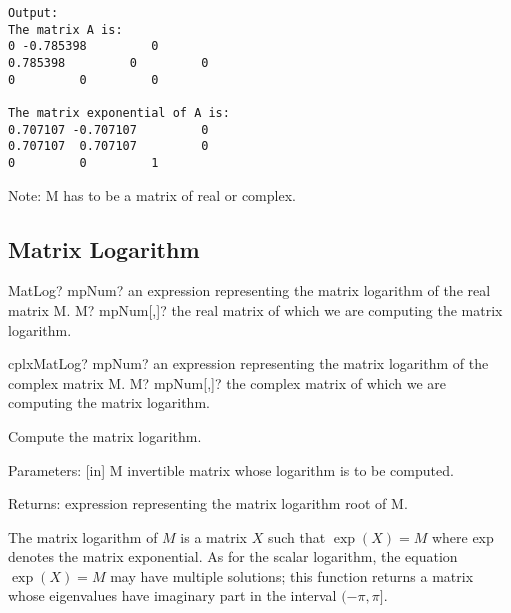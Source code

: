 \begin{verbatim}
Output:
The matrix A is:
0 -0.785398         0
0.785398         0         0
0         0         0

The matrix exponential of A is:
0.707107 -0.707107         0
0.707107  0.707107         0
0         0         1
\end{verbatim} 

Note: M has to be a matrix of real or complex.




\subsection{Matrix Logarithm}


\begin{mpFunctionsExtract}
	\mpFunctionOne
	{MatLog? mpNum? an expression representing the matrix logarithm of the real matrix M.}
	{M? mpNum[,]? the real matrix of which we are computing the matrix logarithm.}
\end{mpFunctionsExtract}

\vspace{0.6cm}
\begin{mpFunctionsExtract}
	\mpFunctionOne
	{cplxMatLog? mpNum? an expression representing the matrix logarithm of the complex matrix M.}
	{M? mpNum[,]? the complex matrix of which we are computing the matrix logarithm.}
\end{mpFunctionsExtract}

%

\vspace{0.3cm}
Compute the matrix logarithm.

Parameters: [in] M invertible matrix whose logarithm is to be computed.  

Returns: expression representing the matrix logarithm root of M.

The matrix logarithm of $M$ is a matrix $X$ such that $\exp(X)=M$ where exp denotes the matrix exponential. As for the scalar logarithm, the equation $\exp(X) = M$ may have multiple solutions; this function returns a matrix whose eigenvalues have imaginary part in the interval $(-\pi, \pi]$.

